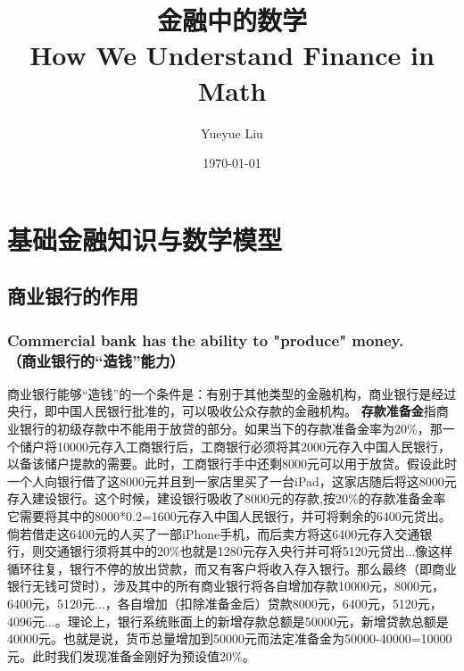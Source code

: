 \documentclass{article}
\title{金融中的数学\\How We Understand Finance in Math}
\author{Yueyue Liu}
\date{\today}
\begin{document}
\maketitle
\section{基础金融知识与数学模型}
\subsection[UTF8]{商业银行的作用}
\subsubsection[UTF8]{Commercial bank has the ability to "produce" money.\\（商业银行的“造钱”能力）}
商业银行能够“造钱”的一个条件是：有别于其他类型的金融机构，商业银行是经过央行，即中国人民银行批准的，可以吸收公众存款的金融机构。\newline
\textbf{存款准备金}指商业银行的初级存款中不能用于放贷的部分。如果当下的存款准备金率为20\%，那一个储户将10000元存入工商银行后，工商银行必须将其2000元存入中国人民银行，以备该储户提款的需要。此时，工商银行手中还剩8000元可以用于放贷。假设此时一个人向银行借了这8000元并且到一家店里买了一台iPad，这家店随后将这8000元存入建设银行。这个时候，建设银行吸收了8000元的存款,按20\%的存款准备金率它需要将其中的8000*0.2=1600元存入中国人民银行，并可将剩余的6400元贷出。倘若借走这6400元的人买了一部iPhone手机，而后卖方将这6400元存入交通银行，则交通银行须将其中的20\%也就是1280元存入央行并可将5120元贷出...像这样循环往复，银行不停的放出贷款，而又有客户将收入存入银行。那么最终（即商业银行无钱可贷时），涉及其中的所有商业银行将各自增加存款10000元，8000元，6400元，5120元...，各自增加（扣除准备金后）贷款8000元，6400元，5120元，4096元...。理论上，银行系统账面上的新增存款总额是50000元，新增贷款总额是40000元。也就是说，货币总量增加到50000元而法定准备金为50000-40000=10000元。此时我们发现准备金刚好为预设值20\%。
\end{document}
